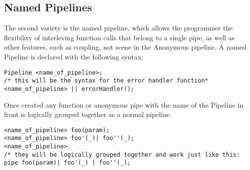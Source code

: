 \documentclass[./LRM_main.tex]{subfiles}
\begin{document}
\subsection{Named Pipelines}
The second variety is the named pipeline, which allows the programmer the flexibility of interleving function calls that belong to a single pipe, as well as other features, such as coupling, not scene in the Anonymous pipeline. A named Pipeline is declared with the following syntax:
\begin{lstlisting}
Pipeline <name_of_pipeline>;
/* this will be the syntax for the error handler function*
<name_of_pipeline> || errorHandler();
\end{lstlisting}
Once created any function or anonymous pipe with the name of the Pipeline in front is logically grouped together as a normal pipeline.
\begin{lstlisting}
<name_of_pipeline> foo(param);
<name_of_pipeline> foo'(_)| foo''(_);
<name_of_pipeline>
/* they will be logically grouped together and work just like this:
pipe foo(param)| foo'(_) | foo''(_);
\end{lstlisting}
\begin{comment}
\subsection{Pipeline Control Flow}
Pipes have their own control flow mechanisms, gobacks and couplings which allow the programmer to 
\subsubsection{goback}
\subsubsection{Coupling}
The coupiling feature, which will allow one named pipe to be connected with another one from a specific point. This will allow the progorammer to write a traditional synchrounous program, test it, then group together function calls that could be ran asynchronously at a later time.
\begin{lstlisting}
Pipeline <From>;
Pipeline <Into>;
<From> foo(param);
<From> coupling <Into> foo'(_);
<Into> foo''(_);
<From> foo'(_)| foo''(_);
/* this will allow A to */
\end{lstlisting}
\subsection*{Data types}

\end{comment}


\end{document}
